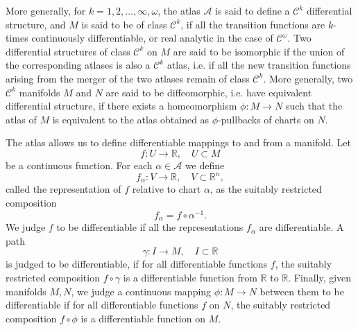 \documentclass{article}
\newcommand{\reals}{\mathbb{R}}
\newcommand{\cA}{\mathcal{A}}
\newcommand{\cC}{\mathcal{C}}
\begin{document}
More generally, for $k=1,2,\ldots,\infty,\omega$, the atlas $\cA$ is
said to define a $\cC^k$ differential structure, and $M$ is said to be
of class $\cC^k$, if all the transition functions are $k$-times
continuously differentiable, or real analytic in the case of
$\cC^\omega$.  Two differential structures of class $\cC^k$ on $M$ are
said to be isomorphic if the union of the corresponding atlases is
also a $\cC^k$ atlas, i.e. if all the new transition functions arising
from the merger of the two atlases remain of class $\cC^k$.  More
generally, two $\cC^k$ manifolds $M$ and $N$ are said to be
diffeomorphic, i.e.  have equivalent differential structure, if there
exists a homeomorphism $\phi:M\to N$ such that the atlas of $M$ is
equivalent to the atlas obtained as $\phi$-pullbacks of charts on $N$.

The atlas allows us to define differentiable mappings to and from a
manifold. Let
$$f:U\rightarrow\reals,\quad U\subset M$$
be a continuous function. For each $\alpha\in \cA$ we define
$$f_\alpha: V \rightarrow \reals,\quad V\subset\reals^n,$$
called the
representation of $f$ relative to chart $\alpha$, as the suitably
restricted composition
$$f_\alpha = f\circ \alpha^{-1}.$$
We judge $f$ to be differentiable if all
the representations $f_\alpha$ are differentiable. A path
$$\gamma: I\rightarrow M,\quad I\subset\reals$$
is judged to be differentiable, if for all differentiable
functions
$f$, the suitably restricted composition $f\circ\gamma$ is a
differentiable function from $\reals$ to $\reals$. Finally, given
manifolds $M, N$, we judge a continuous mapping $\phi:M\rightarrow
N$
between them to be differentiable if for all differentiable
functions
$f$ on $N$, the suitably restricted composition $f\circ\phi$ is a
differentiable function on $M$.
\end{document}
